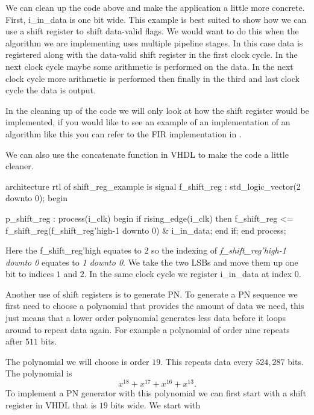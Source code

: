 We can clean up the code above and make the application a little more concrete. First, i\_in\_data is one bit wide. This example is best suited to show how we can use a shift register to shift data-valid flags. We would want to do this when the algorithm we are implementing uses multiple pipeline stages. In this case data is registered along with the data-valid shift register in the first clock cycle. In the next clock cycle maybe some arithmetic is performed on the data. In the next clock cycle more arithmetic is performed then finally in the third and last clock cycle the data is output. 

In the cleaning up of the code we will only look at how the shift register would be implemented, if you would like to see an example of an implementation of an algorithm like this you can refer to the \ac{FIR} implementation in .

We can also use the concatenate function in \ac{VHDL} to make the code a little cleaner.

\begin{VHDLlisting}[tabsize=4]
architecture rtl of shift_reg_example is
    signal f_shift_reg : std_logic_vector(2 downto 0);
begin

p_shift_reg : process(i_clk)
begin
    if rising_edge(i_clk) then
        f_shift_reg <= f_shift_reg(f_shift_reg'high-1 downto 0) &
                       i_in_data;
    end if;
end process;
\end{VHDLlisting}

Here the f\_shift\_reg'high equates to $2$ so the indexing of \emph{f\_shift\_reg'high-1 downto 0} equates to \emph{1 downto 0}. We take the two \ac{LSB}s and move them up one bit to indices $1$ and $2$. In the same clock cycle we register i\_in\_data at index $0$.

Another use of shift registers is to generate \ac{PN}. To generate a \ac{PN} sequence we first need to choose a polynomial that provides the amount of data we need, this just means that a lower order polynomial generates less data before it loops around to repeat data again. For example a polynomial of order nine repeats after $511$ bits. 

The polynomial we will choose is order $19$. This repeats data every $524,287$ bits. The polynomial is 
\begin{equation}
x^{18} + x^{17} + x^{16} + x^{13}. 
\label{eq:pneq}
\end{equation}
\noindent
To implement a \ac{PN} generator with this polynomial we can first start with a shift register in \ac{VHDL} that is $19$ bits wide. We start with 

